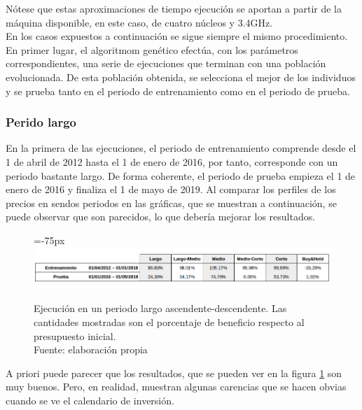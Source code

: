 N\'otese que estas aproximaciones de tiempo ejecuci\'on se aportan a partir de la m\'aquina disponible, en este caso, de cuatro n\'ucleos y 3.4GHz.\\

En los casos expuestos a continuaci\'on se sigue siempre el mismo procedimiento. En primer lugar, el algoritmom gen\'etico efect\'ua, con los par\'ametros correspondientes, una serie de ejecuciones que terminan con una poblaci\'on evolucionada. De esta poblaci\'on obtenida, se selecciona el mejor de los individuos y se prueba tanto en el periodo de entrenamiento como en el periodo de prueba.\\

\subsubsection{Perido largo}

En la primera de las ejecuciones, el periodo de entrenamiento comprende desde el 1 de abril de 2012 hasta el 1 de enero de 2016, por tanto, corresponde con un periodo bastante largo. De forma coherente, el periodo de prueba empieza el 1 de enero de 2016 y finaliza el 1 de mayo de 2019. Al comparar los perfiles de los precios en sendos periodos en las gr\'aficas, que se muestran a continuaci\'on, se puede observar que son parecidos, lo que deber\'ia mejorar los resultados.\\

     	\begin{figure}[H]
     		\centering\leftskip=-75px
     		\includegraphics[scale=0.60]{imagenes/Large_period.png}
     		\caption[Ejecuci\'on en un periodo largo ascendente-descendente]{Ejecuci\'on en un periodo largo ascendente-descendente. Las cantidades mostradas son el porcentaje de beneficio respecto al presupuesto inicial.\\ Fuente: elaboraci\'on propia}
     		\label{fig:large_period}
     	\end{figure}
     	
A priori puede parecer que los resultados, que se pueden ver en la figura \ref{fig:large_period} son muy buenos. Pero, en realidad, muestran algunas carencias que se hacen obvias cuando se ve el calendario de inversi\'on.\\

